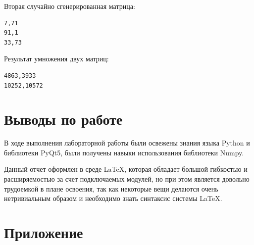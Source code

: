 \documentclass[a4paper,14pt]{extarticle}
\begin{document}
Вторая случайно сгенерированная матрица:
\begin{verbatim}
7,71
91,1
33,73
\end{verbatim}

Результат умножения двух матриц:
\begin{verbatim}
4863,3933
10252,10572
\end{verbatim}

\newpage

\section*{Выводы по работе}
В ходе выполнения лабораторной работы были освежены знания языка Python и библиотеки PyQt5, были получены навыки использования библиотеки Numpy.

Данный отчет оформлен в среде LaTeX, которая обладает большой гибкостью и расширяемостью за счет подключаемых модулей, но при этом является довольно трудоемкой в плане освоения, так как некоторые вещи делаются очень нетривиальным образом и необходимо знать синтаксис системы LaTeX.

\newpage

\section*{Приложение}
\inputminted[mathescape,linenos,breaklines]{python}{../src/main.py}
\end{document}
